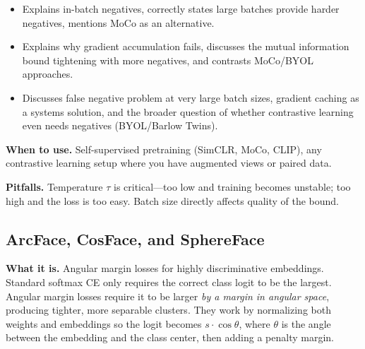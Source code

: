 \begin{interviewq}

\goodgreat
\begin{itemize}
    \item {} Explains in-batch negatives, correctly states large batches provide harder negatives, mentions MoCo as an alternative.
    \item {} Explains why gradient accumulation fails, discusses the mutual information bound tightening with more negatives, and contrasts MoCo/BYOL approaches.
    \item {} Discusses false negative problem at very large batch sizes, gradient caching as a systems solution, and the broader question of whether contrastive learning even needs negatives (BYOL/Barlow Twins).
\end{itemize}

\end{interviewq}

\textbf{When to use.} Self-supervised pretraining (SimCLR, MoCo, CLIP), any contrastive learning setup where you have augmented views or paired data.

\textbf{Pitfalls.} Temperature $\tau$ is critical---too low and training becomes unstable; too high and the loss is too easy. Batch size directly affects quality of the bound.

\subsection{ArcFace, CosFace, and SphereFace}

\textbf{What it is.} Angular margin losses for highly discriminative embeddings. Standard softmax CE only requires the correct class logit to be the largest. Angular margin losses require it to be larger \textit{by a margin in angular space}, producing tighter, more separable clusters. They work by normalizing both weights and embeddings so the logit becomes $s \cdot \cos\theta$, where $\theta$ is the angle between the embedding and the class center, then adding a penalty margin.

